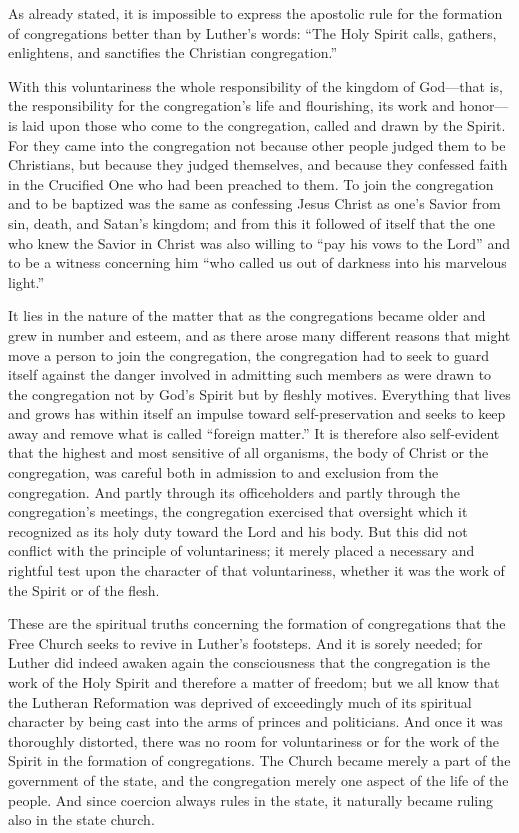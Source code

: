 As already stated, it is impossible to express the apostolic rule for the formation of congregations better than by Luther’s words: “The Holy Spirit calls, gathers, enlightens, and sanctifies the Christian congregation.”

With this voluntariness the whole responsibility of the kingdom of God—that is, the responsibility for the congregation’s life and flourishing, its work and honor—is laid upon those who come to the congregation, called and drawn by the Spirit. For they came into the congregation not because other people judged them to be Christians, but because they judged themselves, and because they confessed faith in the Crucified One who had been preached to them. To join the congregation and to be baptized was the same as confessing Jesus Christ as one’s Savior from sin, death, and Satan’s kingdom; and from this it followed of itself that the one who knew the Savior in Christ was also willing to “pay his vows to the Lord” and to be a witness concerning him “who called us out of darkness into his marvelous light.”

It lies in the nature of the matter that as the congregations became older and grew in number and esteem, and as there arose many different reasons that might move a person to join the congregation, the congregation had to seek to guard itself against the danger involved in admitting such members as were drawn to the congregation not by God’s Spirit but by fleshly motives. Everything that lives and grows has within itself an impulse toward self-preservation and seeks to keep away and remove what is called “foreign matter.” It is therefore also self-evident that the highest and most sensitive of all organisms, the body of Christ or the congregation, was careful both in admission to and exclusion from the congregation. And partly through its officeholders and partly through the congregation’s meetings, the congregation exercised that oversight which it recognized as its holy duty toward the Lord and his body. But this did not conflict with the principle of voluntariness; it merely placed a necessary and rightful test upon the character of that voluntariness, whether it was the work of the Spirit or of the flesh.

These are the spiritual truths concerning the formation of congregations that the Free Church seeks to revive in Luther’s footsteps. And it is sorely needed; for Luther did indeed awaken again the consciousness that the congregation is the work of the Holy Spirit and therefore a matter of freedom; but we all know that the Lutheran Reformation was deprived of exceedingly much of its spiritual character by being cast into the arms of princes and politicians. And once it was thoroughly distorted, there was no room for voluntariness or for the work of the Spirit in the formation of congregations. The Church became merely a part of the government of the state, and the congregation merely one aspect of the life of the people. And since coercion always rules in the state, it naturally became ruling also in the state church.


